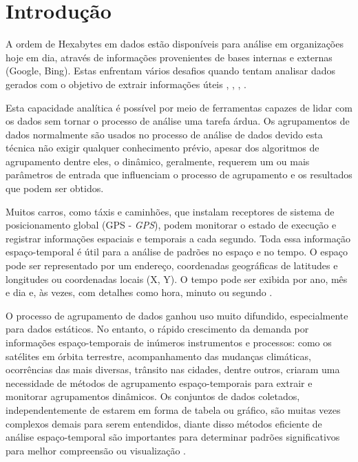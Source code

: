 \chapter{Introdução}
\label{chap:introducao}
A ordem de Hexabytes em dados estão disponíveis para análise em organizações hoje em dia, através de informações provenientes de bases internas e externas (Google, Bing). Estas enfrentam vários desafios quando tentam analisar dados gerados com o objetivo de extrair informações úteis \cite{Wu2008}, \cite{Mitsa:2010}, \cite{cheng:2014}, \cite{Atluri:2018}.

Esta capacidade analítica é possível por meio de ferramentas capazes de lidar com os dados sem tornar o processo de análise uma tarefa árdua. Os agrupamentos de dados normalmente são usados no processo de análise de dados devido esta técnica não exigir qualquer conhecimento prévio, apesar dos algoritmos de agrupamento dentre eles, o dinâmico, geralmente, requerem um ou mais parâmetros de entrada que influenciam o processo de agrupamento e os resultados que podem ser obtidos. 

Muitos carros, como táxis e caminhões, que instalam receptores de sistema de posicionamento global (\acrshort{GPS} - \emph{\acrlong{GPS}}), podem monitorar o estado de execução e registrar informações espaciais e temporais a cada segundo. Toda essa informação espaço-temporal é útil para a análise de padrões no espaço e no tempo. O espaço pode ser representado por um endereço, coordenadas geográficas de latitudes e longitudes ou coordenadas locais (X, Y). O tempo pode ser exibida por ano, mês e dia e, às vezes, com detalhes como hora, minuto ou segundo \cite{Zhicheng:2019}.


O processo de agrupamento de dados ganhou uso muito difundido, especialmente para dados estáticos. No entanto, o rápido crescimento da demanda por informações espaço-temporais de inúmeros instrumentos e processos: como os satélites em órbita terrestre, acompanhamento das mudanças climáticas, ocorrências das mais diversas, trânsito nas cidades, dentre outros, criaram uma necessidade de métodos de agrupamento espaço-temporais para extrair e monitorar agrupamentos dinâmicos. Os conjuntos de dados coletados, independentemente de estarem em forma de tabela ou gráfico, são muitas vezes complexos demais para serem entendidos, diante disso métodos eficiente de análise espaço-temporal são importantes para determinar padrões significativos para melhor compreensão ou visualização \cite{Shekhar2011}.

